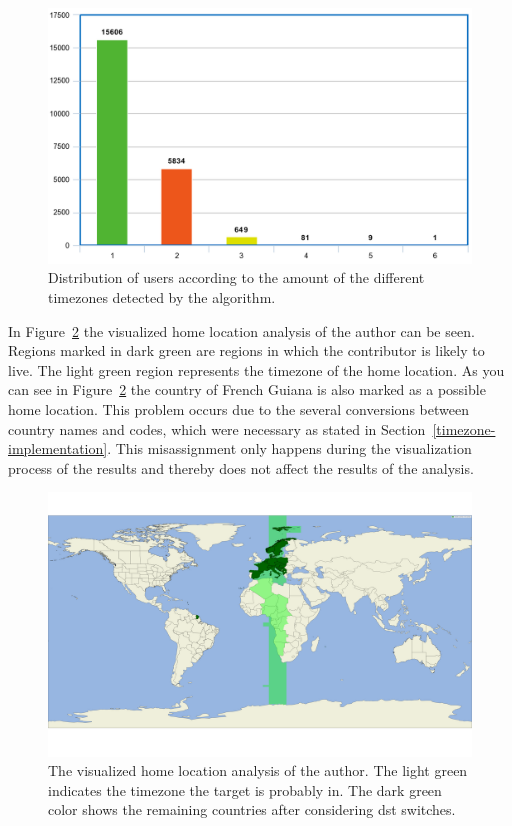 \begin{figure}[h]
    \includegraphics[scale=0.38]{./graphs/analysis/timezone-distribution}
    \centering
    \caption{Distribution of users according to the amount of the different timezones detected by the algorithm.}\label{fig:timezone-distribution}
\end{figure}

In Figure~\ref{fig:author-home-location} the visualized home location analysis of the author can be seen.
Regions marked in dark green are regions in which the contributor is likely to live.
The light green region represents the timezone of the home location.
As you can see in Figure~\ref{fig:author-home-location} the country of French Guiana is also marked as a possible home location.
This problem occurs due to the several conversions between country names and codes, which were necessary as stated in Section~\ref{timezone-implementation}.
This misassignment only happens during the visualization process of the results and thereby does not affect the results of the analysis.

\begin{figure}[h]
    \includegraphics[scale=0.10]{./graphs/analysis/author-home-location}
    \centering
    \caption{The visualized home location analysis of the author.
    The light green indicates the timezone the target is probably in.
    The dark green color shows the remaining countries after considering \ac{dst} switches.}\label{fig:author-home-location}
\end{figure}

